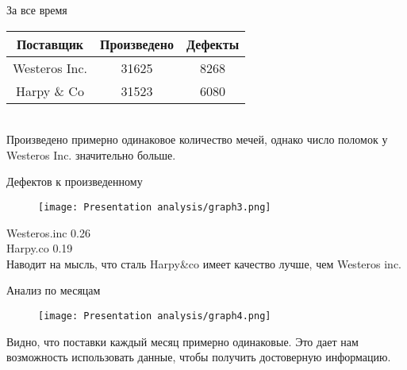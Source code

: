 \documentclass{beamer}
\begin{document}
    \begin{frame}{За все время}
        \begin{figure}[H]
             \centering
             \begin{subfigure}
                \texttt{[image: Presentation analysis/graph1.png]}
             \end{subfigure}
            \begin{subfigure}
                \texttt{[image: Presentation analysis/graph2.png]}
            \end{subfigure}
        \end{figure}
        \begin{table}[H]
            \begin{right}
                \begin{tabular}{|c|c|c|}
                    \hline
                    Поставщик & Произведено & Дефекты \\
                    \hline
                    Westeros Inc. & 31625 & 8268 \\
                    \hline
                    Harpy \& Co & 31523 & 6080 \\
                    \hline
                \end{tabular}
            \end{right}
            \\Произведено примерно одинаковое количество мечей, однако 
            число поломок у Westeros Inc. значительно больше.
        \end{table} 
        
        
    \end{frame}
    
    \begin{frame}{Дефектов к произведенному}
        \begin{figure}
            \centering
            \texttt{[image: Presentation analysis/graph3.png]}
        \end{figure}
        Westeros.inc 0.26\\
        Harpy.co 0.19\\
        Наводит на мысль, что сталь Harpy\&co имеет качество лучше, чем Westeros inc.
    \end{frame}
    
    \begin{frame}{Анализ по месяцам}
        \begin{figure}
            \centering
            \texttt{[image: Presentation analysis/graph4.png]}
        \end{figure}
        Видно, что поставки каждый месяц примерно одинаковые. Это дает
        нам возможность использовать данные, чтобы получить достоверную информацию.
    \end{frame}
    
\end{document}
